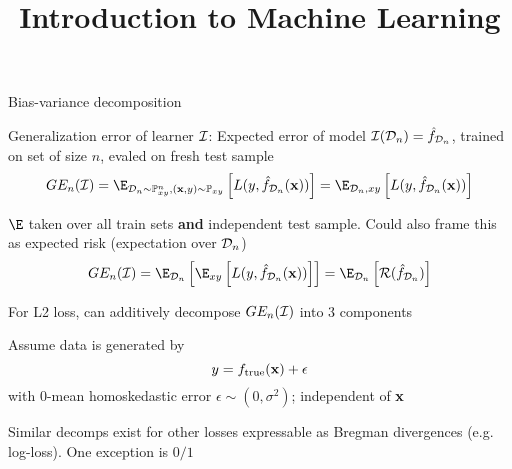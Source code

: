 \documentclass[11pt,compress,t,notes=noshow, xcolor=table]{beamer}
\title{Introduction to Machine Learning}
\begin{document}

\begin{framei}[sep=M]{Bias-variance decomposition}

\item Generalization error of learner  $\mathcal{I}$: 
Expected error of model $\mathcal{I}(\mathcal{D}_n) = \hat{f}_{\mathcal{D}_n}$, trained on set of size $n$, evaled on fresh test sample
$$
GE_n(\ind) = \E_{\D_n \sim \Pxy^n, (\xv, y) \sim \Pxy}\left[ L(y, \fh_{\D_n}(\xv)) \right] = \E_{\D_n, xy}\left[L(y, \fh_{\D_n}(\xv)) \right]  
$$

\item $\E$ taken over all train sets \textbf{and} independent test sample. Could also frame this as expected risk (expectation over $\mathcal{D}_n$)
$$GE_n(\ind) = \E_{\D_n}\left[\E_{xy}\left[ L(y, \fh_{\D_n}(\xv))\right]\right] =  \E_{\D_n}\left[\risk(\fh_{\D_n})\right]$$

\item For L2 loss, can additively decompose  $GE_n(\mathcal{I})$ into 3 components

\item Assume data is generated by 
$$
y = f_{\text{true}}(\mathbf{x}) + \epsilon
$$
with 0-mean homoskedastic error $\epsilon \sim (0, \sigma^2)$; independent of $\mathbf{x}$

\item Similar decomps exist for other losses expressable as Bregman divergences (e.g. log-loss). One exception is $0/1$ 

\end{framei}
\end{document}
